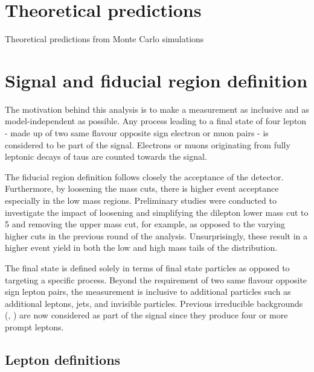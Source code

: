 \section{Theoretical predictions}
\label{sec:theory}

Theoretical predictions from Monte Carlo simulations

\section{Signal and fiducial region definition}
\label{sec:signaldef}

The motivation behind this analysis is to make a measurement as inclusive and as model-independent as possible. Any process leading to a final state of four lepton - made up of two same flavour opposite sign electron or muon pairs - is considered to be part of the signal. Electrons or muons originating from fully leptonic decays of taus are counted towards the signal. 

The fiducial region definition follows closely the acceptance of the detector. Furthermore, by loosening the mass cuts, there is higher event acceptance especially in the low mass regions. Preliminary studies were conducted to investigate the impact of loosening and simplifying the dilepton lower mass cut to \unit{5}{\GeV} and removing the upper mass cut, for example, as opposed to the varying higher cuts in the previous round of the analysis. Unsurprisingly, these result in a higher event yield in both the low and high mass tails of the \mFourL distribution. 

The final state is defined solely in terms of final state particles as opposed to targeting a specific process. Beyond the requirement of two same flavour opposite sign lepton pairs, the measurement is inclusive to additional particles such as additional leptons, jets, and invisible particles. Previous irreducible backgrounds (\VVV, \ttZ) are now considered as part of the signal since they produce four or more prompt leptons.


\subsection{Lepton definitions}

